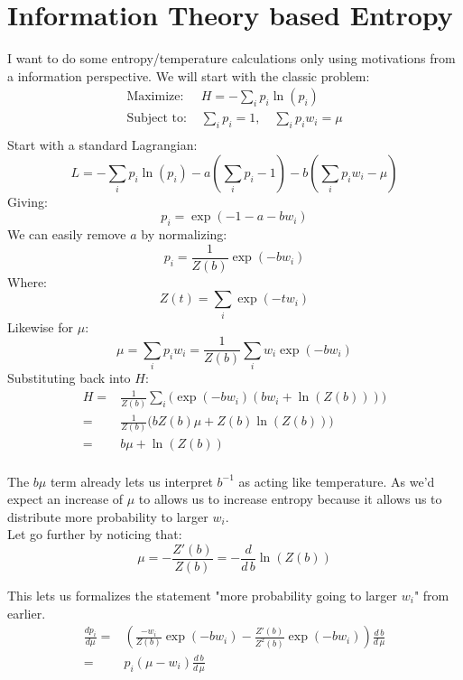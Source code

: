 
\section{Information Theory based Entropy}
I want to do some entropy/temperature calculations only using motivations from a information perspective.
We will start with the classic problem:
\begin{equation*}
\begin{aligned}
	\text{Maximize: }& H=-\sum_i p_i\ln(p_i)\\
	\text{Subject to: }& \sum_ip_i=1,\quad \sum_ip_iw_i = \mu \\
\end{aligned}
\end{equation*}
Start with a standard Lagrangian:
\[ L = -\sum_ip_i\ln(p_i)-a\left(\sum_i p_i - 1\right) - b\left(\sum_i p_iw_i - \mu\right)\]
Giving:
\[p_i = \exp(-1-a-bw_i)\]
We can easily remove $a$ by normalizing:
\[p_i = \frac{1}{Z(b)}\exp(-bw_i)\]
Where:
\[Z(t) = \sum_i \exp(-tw_i)\]
Likewise for $\mu$:
\[\mu = \sum_ip_iw_i = \frac{1}{Z(b)}\sum_iw_i\exp(-bw_i)\]
Substituting back into $H$:
\begin{equation*}
\begin{aligned}
	H =& \frac{1}{Z(b)}\sum_i\bigg(\exp(-bw_i)(bw_i+\ln(Z(b)))\bigg)\\
	=& \frac{1}{Z(b)}\bigg(bZ(b)\mu+Z(b)\ln(Z(b))\bigg)\\
	=& b\mu+\ln(Z(b))\\
\end{aligned}
\end{equation*}

The $b\mu$ term already lets us interpret $b^{-1}$ as acting like temperature.
As we'd expect an increase of $\mu$ to allows us to increase entropy because it allows us to distribute more probability to larger $w_i$.
\\

Let go further by noticing that:
\[\mu = - \frac{Z'(b)}{Z(b)} = -\frac{d}{d\,b}\ln(Z(b))\]

This lets us formalizes the statement "more probability going to larger $w_i$" from earlier.
\begin{equation*}
\begin{aligned}
	\frac{d p_i}{d \mu} =& \left(\frac{-w_i}{Z(b)}\exp(-bw_i)-\frac{Z'(b)}{Z^2(b)}\exp(-bw_i)\right)\frac{d\,b}{d\,\mu}\\
	=&p_i(\mu-w_i)\frac{d\,b}{d\,\mu}\\
\end{aligned}
\end{equation*}

